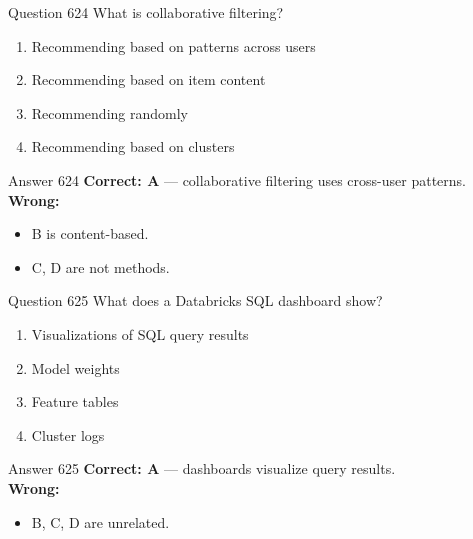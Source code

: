 \documentclass[aspectratio=169,11pt]{beamer}
\begin{document}
	\begin{frame}{Question 624}
		What is collaborative filtering?
		\begin{enumerate}[label=\Alph*.]
			\item Recommending based on patterns across users
			\item Recommending based on item content
			\item Recommending randomly
			\item Recommending based on clusters
		\end{enumerate}
	\end{frame}
	\begin{frame}{Answer 624}
		\textbf{Correct: A} --- collaborative filtering uses cross-user patterns.\\
		\vspace{0.5em}
		\textbf{Wrong:}
		\begin{itemize}
			\item B is content-based.
			\item C, D are not methods.
		\end{itemize}
	\end{frame}
	
	\begin{frame}{Question 625}
		What does a Databricks SQL dashboard show?
		\begin{enumerate}[label=\Alph*.]
			\item Visualizations of SQL query results
			\item Model weights
			\item Feature tables
			\item Cluster logs
		\end{enumerate}
	\end{frame}
	\begin{frame}{Answer 625}
		\textbf{Correct: A} --- dashboards visualize query results.\\
		\vspace{0.5em}
		\textbf{Wrong:}
		\begin{itemize}
			\item B, C, D are unrelated.
		\end{itemize}
	\end{frame}
	
\end{document}
